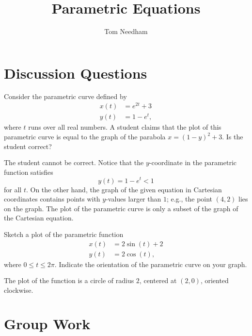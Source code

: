 \documentclass[noauthor,handout]{ximera}
\author{Tom Needham}
\title[Collaborate:]{Parametric Equations}
\begin{document}
\begin{abstract}
\end{abstract}
\maketitle

\section{Discussion Questions}

\begin{problem}
Consider the parametric curve defined by 
\begin{align*}
x(t) &= e^{2t} + 3 \\
y(t) &= 1-e^t,
\end{align*}
where $t$ runs over all real numbers. A student claims that the plot of this parametric curve is equal to the graph of the parabola $x = (1-y)^2 + 3$. Is the student correct?
\begin{freeResponse}
The student cannot be correct. Notice that the $y$-coordinate in the parametric function satisfies 
$$
y(t) = 1- e^t < 1
$$
for all $t$. On the other hand, the graph of the given equation in Cartesian coordinates contains points with $y$-values larger than $1$; e.g., the point $(4,2)$ lies on the graph. The plot of the parametric curve is only a subset of the graph of the Cartesian equation.
\end{freeResponse}
\end{problem}

\begin{problem}
Sketch a plot of the parametric function
\begin{align*}
x(t) &= 2 \sin (t) +2\\
y(t) &= 2 \cos (t),
\end{align*}
where $0 \leq t \leq 2\pi$. Indicate the orientation of the parametric curve on your graph.

\begin{freeResponse}
The plot of the function is a circle of radius $2$, centered at $(2,0)$, oriented clockwise.
\end{freeResponse}
\end{problem}


\section{Group Work}
\end{document}

